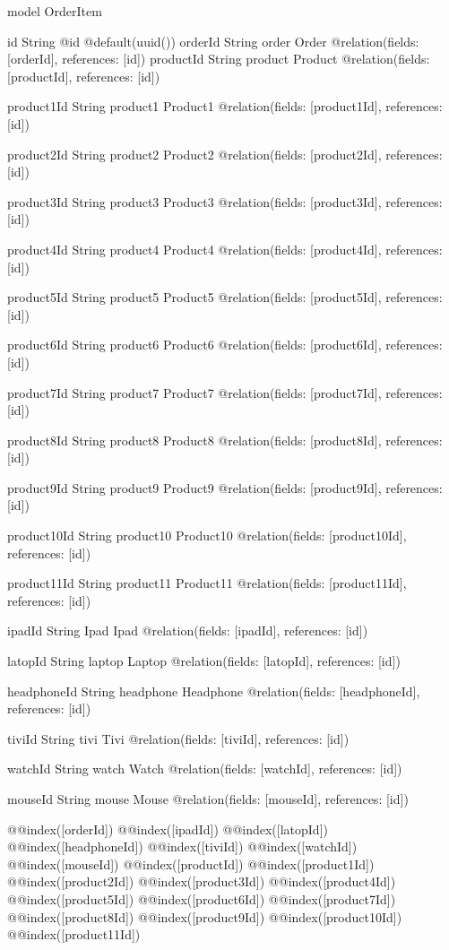 model OrderItem {
  id        String  @id @default(uuid())
  orderId   String
  order     Order   @relation(fields: [orderId], references: [id])
  productId String
  product   Product @relation(fields: [productId], references: [id])

  product1Id String
  product1   Product1 @relation(fields: [product1Id], references: [id])

  product2Id String
  product2   Product2 @relation(fields: [product2Id], references: [id])

  product3Id String
  product3   Product3 @relation(fields: [product3Id], references: [id])

  product4Id String
  product4   Product4 @relation(fields: [product4Id], references: [id])

  product5Id String
  product5   Product5 @relation(fields: [product5Id], references: [id])

  product6Id String
  product6   Product6 @relation(fields: [product6Id], references: [id])

  product7Id String
  product7   Product7 @relation(fields: [product7Id], references: [id])

  product8Id String
  product8   Product8 @relation(fields: [product8Id], references: [id])

  product9Id String
  product9   Product9 @relation(fields: [product9Id], references: [id])

  product10Id String
  product10   Product10 @relation(fields: [product10Id], references: [id])

  product11Id String
  product11   Product11 @relation(fields: [product11Id], references: [id])

  ipadId String
  Ipad   Ipad   @relation(fields: [ipadId], references: [id])

  latopId String
  laptop  Laptop @relation(fields: [latopId], references: [id])

  headphoneId String
  headphone   Headphone @relation(fields: [headphoneId], references: [id])

  tiviId String
  tivi   Tivi   @relation(fields: [tiviId], references: [id])

  watchId String
  watch   Watch  @relation(fields: [watchId], references: [id])

  mouseId String
  mouse   Mouse  @relation(fields: [mouseId], references: [id])

  @@index([orderId])
  @@index([ipadId])
  @@index([latopId])
  @@index([headphoneId])
  @@index([tiviId])
  @@index([watchId])
  @@index([mouseId])
  @@index([productId])
  @@index([product1Id])
  @@index([product2Id])
  @@index([product3Id])
  @@index([product4Id])
  @@index([product5Id])
  @@index([product6Id])
  @@index([product7Id])
  @@index([product8Id])
  @@index([product9Id])
  @@index([product10Id])
  @@index([product11Id])
}






